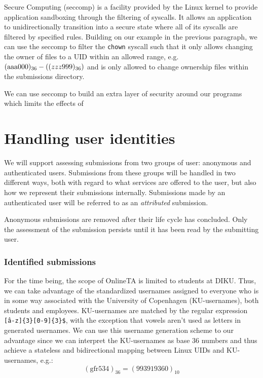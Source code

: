 Secure Computing (seccomp) \cite{seccomp2} is a facility provided by
the Linux kernel to provide application sandboxing through the
filtering of syscalls. It allows an application to unidirectionally
transition into a secure state where all of its syscalls are filtered
by specified rules. Building on our example in the previous paragraph,
we can use the seccomp to filter the \texttt{chown} syscall such that
it only allows changing the owner of files to a UID within an allowed
range, e.g. $(\text{aaa000})_{36} - (\text(zzz999)_{36})$ and is only
allowed to change ownership files within the submissions directory.

We can use seccomp to build an extra layer of security around our
programs which limits the effects of 


\section{Handling user identities}
We will support assessing submissions from two groups of user:
anonymous and authenticated users. Submissions from these groups will
be handled in two different ways, both with regard to what services
are offered to the user, but also how we represent their submissions
internally. Submissions made by an authenticated user will be referred
to as an \textit{attributed} submission.

Anonymous submissions are removed after their life cycle has
concluded. Only the assessment of the submission persists until it has
been read by the submitting user.


\subsubsection{Identified submissions}
For the time being, the scope of OnlineTA is limited to students at
DIKU. Thus, we can take advantage of the standardized usernames
assigned to everyone who is in some way associated with the University
of Copenhagen (KU-usernames), both students and
employees. KU-usernames are matched by the regular expression
\texttt{\^[a-z]\{3\}[0-9]\{3\}\$}, with the exception that vowels aren't used
as letters in generated usernames. We can use this
username generation scheme to our advantage since we can interpret the
KU-usernames as base 36 numbers and thus achieve a stateless and
bidirectional mapping between Linux UIDs and KU-usernames, e.g.:
\begin{equation*}
(\text{gfr534})_{36} = (993919360)_{10}
\end{equation*}

